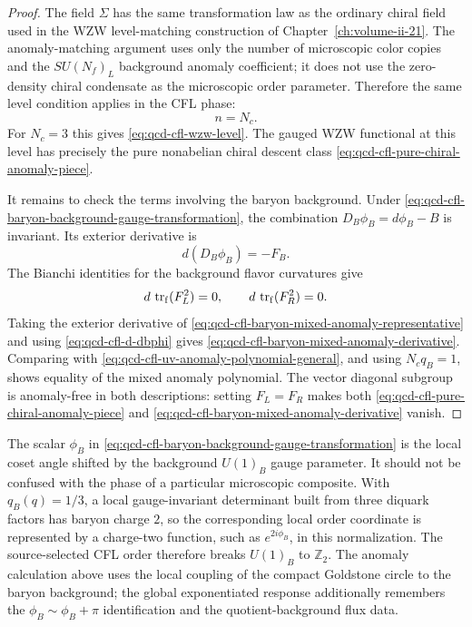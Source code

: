 \begin{proof}
The field \(\Sigma\) has the same transformation law as the ordinary chiral
field used in the WZW level-matching construction of
Chapter~\ref{ch:volume-ii-21}.  The anomaly-matching argument
uses only the number of microscopic color copies and the
\(SU(N_f)_L\) background anomaly coefficient; it does not use the
zero-density chiral condensate as the microscopic order parameter.  Therefore
the same level condition applies in the CFL phase:
\[
  n=N_c .
\]
For \(N_c=3\) this gives \eqref{eq:qcd-cfl-wzw-level}.  The gauged WZW
functional at this level has precisely the pure nonabelian chiral descent
class \eqref{eq:qcd-cfl-pure-chiral-anomaly-piece}.

It remains to check the terms involving the baryon background.  Under
\eqref{eq:qcd-cfl-baryon-background-gauge-transformation}, the combination
\(D_B\phi_B=d\phi_B-B\) is invariant.  Its exterior derivative is
\begin{equation}
  d(D_B\phi_B)=-F_B .
  \label{eq:qcd-cfl-d-dbphi}
\end{equation}
The Bianchi identities for the background flavor curvatures give
\[
  d\,\operatorname{tr}_{\rm f}(F_L^2)=0,
  \qquad
  d\,\operatorname{tr}_{\rm f}(F_R^2)=0 .
\]
Taking the exterior derivative of
\eqref{eq:qcd-cfl-baryon-mixed-anomaly-representative} and using
\eqref{eq:qcd-cfl-d-dbphi} gives
\eqref{eq:qcd-cfl-baryon-mixed-anomaly-derivative}.  Comparing with
\eqref{eq:qcd-cfl-uv-anomaly-polynomial-general}, and using \(N_cq_B=1\),
shows equality of the mixed anomaly polynomial.  The vector diagonal
subgroup is anomaly-free in both descriptions: setting \(F_L=F_R\) makes both
\eqref{eq:qcd-cfl-pure-chiral-anomaly-piece} and
\eqref{eq:qcd-cfl-baryon-mixed-anomaly-derivative} vanish.
\end{proof}

\begin{remark}
\label{rem:qcd-cfl-baryon-goldstone-normalization}
The scalar \(\phi_B\) in
\eqref{eq:qcd-cfl-baryon-background-gauge-transformation} is the local coset
angle shifted by the background \(U(1)_B\) gauge parameter.  It should not be
confused with the phase of a particular microscopic composite.  With
\(q_B(q)=1/3\), a local gauge-invariant determinant built from three diquark
factors has baryon charge \(2\), so the corresponding local order coordinate
is represented by a charge-two function, such as \(e^{2i\phi_B}\), in this
normalization.  The source-selected CFL order therefore breaks
\(U(1)_B\) to \(\mathbb Z_2\).  The anomaly calculation above uses the local
coupling of the compact Goldstone circle to the baryon background; the global
exponentiated response additionally remembers the \(\phi_B\sim\phi_B+\pi\)
identification and the quotient-background flux data.
\end{remark}

